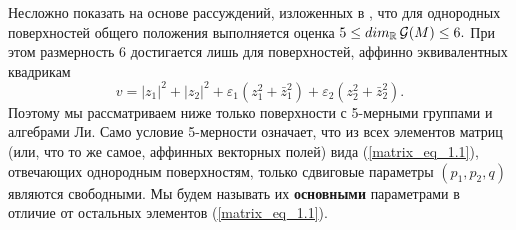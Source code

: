    Несложно показать на основе рассуждений, изложенных в
\cite{Loboda01}, что для однородных поверхностей общего положения
выполняется оценка
$
      5 \le dim_{\Bbb R}\,{\cal{G}}(M) \le 6.
$
  При этом размерность 6 достигается лишь для поверхностей, аффинно
эквивалентных квадрикам
\begin{equation}
    v = |z_1|^2 + |z_2|^2 + \varepsilon_1 (z_1^2 + \bar z_1^2) +
                             \varepsilon_2 (z_2^2 + \bar z_2^2). \label{quadrika_1}
\end{equation}
Поэтому мы рассматриваем ниже только поверхности с 5-мерными группами и
алгебрами Ли. Само условие 5-мерности означает, что из всех элементов
матриц (или, что то же самое, аффинных векторных полей)  вида (\ref{matrix_eq_1.1}),
отвечающих однородным поверхностям,
только сдвиговые параметры $ (p_1, p_2, q) $ являются свободными.
Мы будем называть их {\bf основными} параметрами в отличие от остальных
элементов (\ref{matrix_eq_1.1}).

